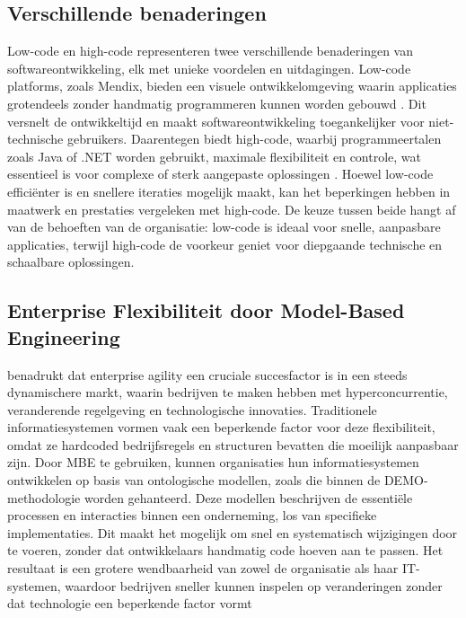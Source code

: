 \subsection{Verschillende benaderingen}
Low-code en high-code representeren twee verschillende benaderingen van softwareontwikkeling, elk met unieke voordelen en uitdagingen. Low-code platforms, zoals Mendix, bieden een visuele ontwikkelomgeving waarin applicaties grotendeels zonder handmatig programmeren kunnen worden gebouwd \autocite{Krouwel_2022}. Dit versnelt de ontwikkeltijd en maakt softwareontwikkeling toegankelijker voor niet-technische gebruikers. Daarentegen biedt high-code, waarbij programmeertalen zoals Java of .NET worden gebruikt, maximale flexibiliteit en controle, wat essentieel is voor complexe of sterk aangepaste oplossingen \autocite{Krouwel_2022}. Hoewel low-code efficiënter is en snellere iteraties mogelijk maakt, kan het beperkingen hebben in maatwerk en prestaties vergeleken met high-code. De keuze tussen beide hangt af van de behoeften van de organisatie: low-code is ideaal voor snelle, aanpasbare applicaties, terwijl high-code de voorkeur geniet voor diepgaande technische en schaalbare oplossingen.

\subsection{Enterprise Flexibiliteit door Model-Based Engineering}
\textcite{Krouwel_2022} benadrukt dat enterprise agility een cruciale succesfactor is in een steeds dynamischere markt, waarin bedrijven te maken hebben met hyperconcurrentie, veranderende regelgeving en technologische innovaties. Traditionele informatiesystemen vormen vaak een beperkende factor voor deze flexibiliteit, omdat ze hardcoded bedrijfsregels en structuren bevatten die moeilijk aanpasbaar zijn. Door \gls{MBE} te gebruiken, kunnen organisaties hun informatiesystemen ontwikkelen op basis van ontologische modellen, zoals die binnen de \gls{DEMO}-methodologie worden gehanteerd. Deze modellen beschrijven de essentiële processen en interacties binnen een onderneming, los van specifieke implementaties. Dit maakt het mogelijk om snel en systematisch wijzigingen door te voeren, zonder dat ontwikkelaars handmatig code hoeven aan te passen. Het resultaat is een grotere wendbaarheid van zowel de organisatie als haar IT-systemen, waardoor bedrijven sneller kunnen inspelen op veranderingen zonder dat technologie een beperkende factor vormt


